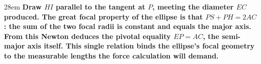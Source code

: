 \documentclass[border=4pt]{standalone}
\begin{document}
\begin{varwidth}{28em}
\large\bfseries
Draw $HI$ parallel to the tangent at $P$, meeting the diameter $EC$ produced.      The great focal property of the ellipse is that $PS+PH=2AC$: the sum      of the two focal radii is constant and equals the major axis. From      this Newton deduces the pivotal equality $EP = AC$, the semi-major      axis itself. This single relation binds the ellipse's focal geometry to the      measurable lengths the force calculation will demand.
\end{varwidth}
\end{document}

